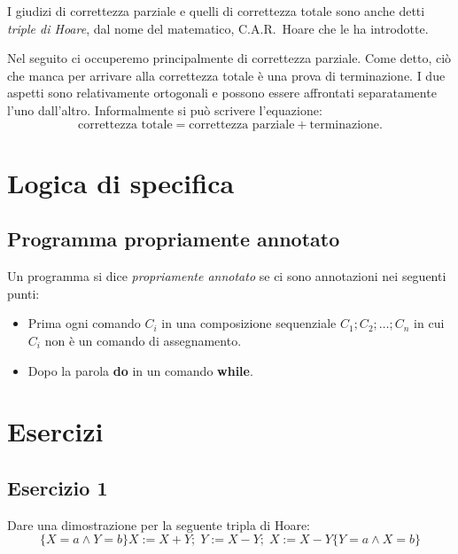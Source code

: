 I giudizi di correttezza parziale e quelli di correttezza totale
sono anche detti \emph{triple di Hoare}, dal nome del matematico,
C.A.R.\ Hoare che le ha introdotte.

Nel seguito ci occuperemo principalmente di correttezza parziale.
Come detto, ciò che manca per arrivare alla correttezza totale
è una prova di terminazione.  I due aspetti sono relativamente
ortogonali e possono essere affrontati separatamente l'uno
dall'altro.  Informalmente si può scrivere l'equazione:
\[
  \textrm{correttezza totale}
    = \textrm{correttezza parziale} + \textrm{terminazione}.
\]

\section{Logica di specifica}


\subsection{Programma propriamente annotato}
\begin{definizione}
Un programma si dice \emph{propriamente annotato} se ci sono annotazioni nei seguenti punti:
\begin{itemize}
        \item Prima ogni comando $C_i$ in una composizione sequenziale $C_1;C_2; \dots ;C_n$ in cui $C_i$ non è un comando di assegnamento.
        \item Dopo la parola \textbf{do} in un comando \textbf{while}.
\end{itemize}
\end{definizione}


\section{Esercizi}

\subsection{Esercizio 1}
Dare una dimostrazione per la seguente tripla di Hoare:
\[ \{X=a  \land Y=b\}  X:=X+Y; \; Y:=X-Y; \; X:=X-Y  \{Y=a  \land  X=b\} \]

